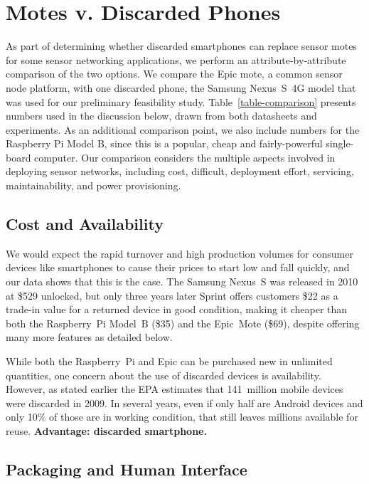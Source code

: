 \section{Motes v. Discarded Phones}
\label{sec-comparison}



As part of determining whether discarded smartphones can replace sensor motes
for some sensor networking applications, we perform an attribute-by-attribute
comparison of the two options. We compare the Epic mote, a common sensor node
platform, with one discarded phone, the Samsung Nexus~S~4G  model that was
used for our preliminary feasibility study. Table~\ref{table-comparison}
presents numbers used in the discussion below, drawn from both datasheets and
experiments. As an additional comparison point, we also include numbers for
the Raspberry Pi Model B, since this is a popular, cheap and fairly-powerful
single-board computer. Our comparison considers the multiple aspects involved
in deploying sensor networks, including cost, difficult, deployment effort,
servicing, maintainability, and power provisioning.

\subsection{Cost and Availability}

We would expect the rapid turnover and high production volumes for consumer
devices like smartphones to cause their prices to start low and fall quickly,
and our data shows that this is the case. The Samsung Nexus~S was released in
2010 at \$529 unlocked, but only three years later Sprint offers customers
\$22 as a trade-in value for a returned device in good condition, making it
cheaper than both the Raspberry~Pi Model~B (\$35) and the Epic~Mote (\$69),
despite offering many more features as detailed below.

While both the Raspberry~Pi and Epic can be purchased new in unlimited
quantities, one concern about the use of discarded devices is availability.
However, as stated earlier the EPA estimates that 141~million mobile devices
were discarded in 2009. In several years, even if only half are Android
devices and only 10\% of those are in working condition, that still leaves
millions available for reuse. \textbf{Advantage: discarded smartphone.}

\subsection{Packaging and Human Interface}

